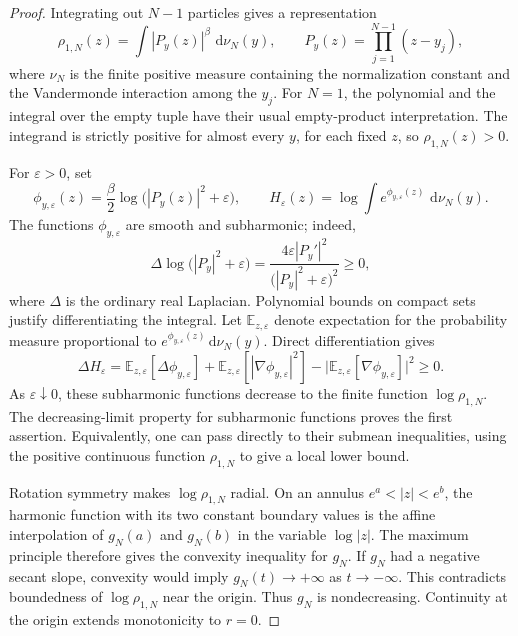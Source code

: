 \documentclass[11pt,a4paper]{article}
\numberwithin{equation}{section}
\theoremstyle{definition}
\theoremstyle{remark}
\newcommand{\dd}{\,\mathrm d}
\begin{document}
\begin{proof}
Integrating out $N-1$ particles gives a representation
\[
 \rho_{1,N}(z)=\int |P_y(z)|^\beta\,\dd\nu_N(y),
 \qquad
 P_y(z)=\prod_{j=1}^{N-1}(z-y_j),
\]
where $\nu_N$ is the finite positive measure containing the normalization
constant and the Vandermonde interaction among the $y_j$.
For $N=1$, the polynomial and the integral over the empty tuple have
their usual empty-product interpretation. The integrand is strictly
positive for almost every $y$, for each fixed $z$, so
$\rho_{1,N}(z)>0$.

For $\varepsilon>0$, set
\[
 \phi_{y,\varepsilon}(z)
 =\frac\beta2\log\bigl(|P_y(z)|^2+\varepsilon\bigr),
 \qquad
 H_\varepsilon(z)
 =\log\int e^{\phi_{y,\varepsilon}(z)}\,\dd\nu_N(y).
\]
The functions $\phi_{y,\varepsilon}$ are smooth and subharmonic; indeed,
\[
 \Delta\log\bigl(|P_y|^2+\varepsilon\bigr)
 =\frac{4\varepsilon|P_y'|^2}
 {\bigl(|P_y|^2+\varepsilon\bigr)^2}\geq0,
\]
where $\Delta$ is the ordinary real Laplacian. Polynomial bounds on
compact sets justify differentiating the integral. Let
$\mathbb E_{z,\varepsilon}$ denote expectation for the probability
measure proportional to
$e^{\phi_{y,\varepsilon}(z)}\dd\nu_N(y)$. Direct differentiation gives
\[
 \Delta H_\varepsilon
 =\mathbb E_{z,\varepsilon}[\Delta\phi_{y,\varepsilon}]
  +\mathbb E_{z,\varepsilon}
       [|\nabla\phi_{y,\varepsilon}|^2]
  -\bigl|\mathbb E_{z,\varepsilon}
       [\nabla\phi_{y,\varepsilon}]\bigr|^2
 \geq0.
\]
As $\varepsilon\downarrow0$, these subharmonic functions decrease to
the finite function $\log\rho_{1,N}$. The decreasing-limit property
for subharmonic functions proves the first assertion. Equivalently,
one can pass directly to their submean inequalities, using the positive
continuous function $\rho_{1,N}$ to give a local lower bound.

Rotation symmetry makes $\log\rho_{1,N}$ radial. On an annulus
$e^a<|z|<e^b$, the harmonic function with its two constant boundary
values is the affine interpolation of $g_N(a)$ and $g_N(b)$ in the
variable $\log|z|$. The maximum principle therefore gives the convexity
inequality for $g_N$. If $g_N$ had a negative secant slope, convexity
would imply $g_N(t)\to+\infty$ as $t\to-\infty$. This contradicts
boundedness of $\log\rho_{1,N}$ near the origin. Thus $g_N$ is
nondecreasing. Continuity at the origin extends monotonicity to
$r=0$.
\end{proof}
\end{document}
